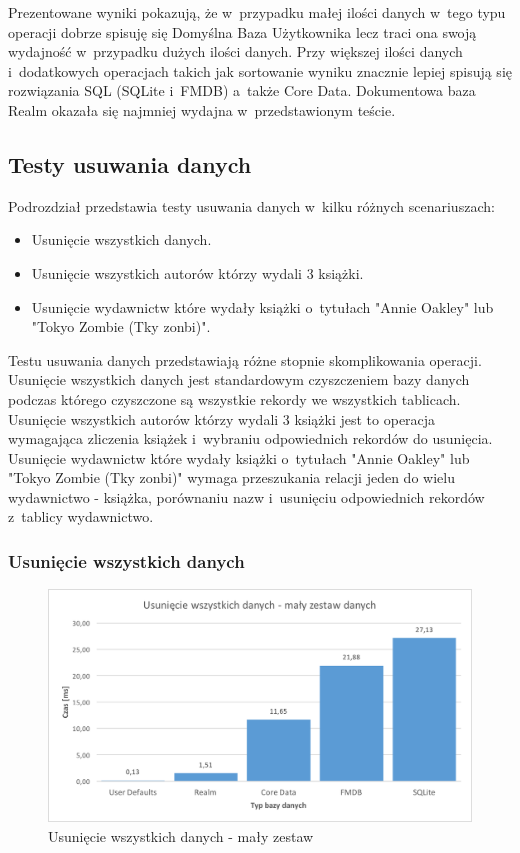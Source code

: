 Prezentowane wyniki pokazują, że w~przypadku małej ilości danych w~tego typu operacji dobrze spisuję się Domyślna Baza Użytkownika lecz traci ona swoją wydajność w~przypadku dużych ilości danych. Przy większej ilości danych i~dodatkowych operacjach takich jak sortowanie wyniku znacznie lepiej spisują się rozwiązania SQL (SQLite i~FMDB) a~także Core Data. Dokumentowa baza Realm okazała się najmniej wydajna w~przedstawionym teście. 

\subsection{Testy usuwania danych}

Podrozdział przedstawia testy usuwania danych w~kilku różnych scenariuszach: 

\begin{itemize}
\item Usunięcie wszystkich danych.
\item Usunięcie wszystkich autorów którzy wydali 3 książki.
\item Usunięcie wydawnictw które wydały książki o~tytułach "Annie Oakley" lub "Tokyo Zombie (Tky zonbi)".
\end{itemize}

Testu usuwania danych przedstawiają różne stopnie skomplikowania operacji. Usunięcie wszystkich danych jest standardowym czyszczeniem bazy danych podczas którego czyszczone są wszystkie rekordy we wszystkich tablicach. Usunięcie wszystkich autorów którzy wydali 3 książki jest to operacja wymagająca zliczenia książek i~wybraniu odpowiednich rekordów do usunięcia. Usunięcie wydawnictw które wydały książki o~tytułach "Annie Oakley" lub "Tokyo Zombie (Tky zonbi)" wymaga przeszukania relacji jeden do wielu wydawnictwo - książka, porównaniu nazw i~usunięciu odpowiednich rekordów z~tablicy wydawnictwo. 

\subsubsection{Usunięcie wszystkich danych}

\begin{figure}[H]
\centering
	\includegraphics[width=15cm]{img/delete_data/delete_all/delete_all_small_test.png}
	\caption{Usunięcie wszystkich danych - mały zestaw}
	\label{fig: delete-all-small}
\end{figure}

